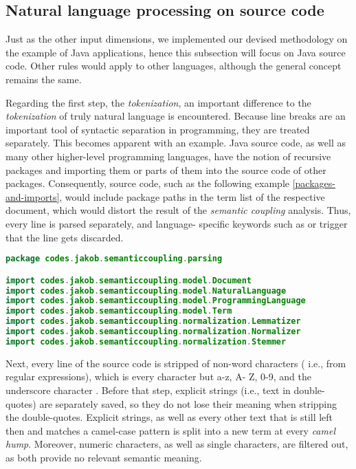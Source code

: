 \documentclass[12pt,a4paper]{report}
\begin{document}
\subsection{Natural language processing on source code}

Just as the other input dimensions, we implemented our devised methodology on
the example of Java applications, hence this subsection will focus on Java
source code. Other rules would apply to other languages, although the general
concept remains the same.

Regarding the first step, the \textit{tokenization}, an important difference to
the \textit{tokenization} of truly natural language is encountered. Because
line breaks are an important tool of syntactic separation in programming, they
are treated separately. This becomes apparent with an example. Java source
code, as well as many other higher-level programming languages, have the notion
of recursive packages and importing them or parts of them into the source code
of other packages. Consequently, source code, such as the following example
\ref{packages-and-imports}, would include package paths in the term list of the
respective document, which would distort the result of the \textit{semantic
coupling} analysis. Thus, every line is parsed separately, and language-
specific keywords such as  or  trigger that the line
gets discarded.

\begin{lstlisting}[caption=Packages and imports in Java, label=packages-and-imports, language=Java, breaklines=true]
package codes.jakob.semanticcoupling.parsing

import codes.jakob.semanticcoupling.model.Document
import codes.jakob.semanticcoupling.model.NaturalLanguage
import codes.jakob.semanticcoupling.model.ProgrammingLanguage
import codes.jakob.semanticcoupling.model.Term
import codes.jakob.semanticcoupling.normalization.Lemmatizer
import codes.jakob.semanticcoupling.normalization.Normalizer
import codes.jakob.semanticcoupling.normalization.Stemmer
\end{lstlisting}

Next, every line of the source code is stripped of non\hyp word characters (
i.e.,  from regular expressions), which is every character but a-z, A-
Z, 0-9, and the underscore character \cite{ieee1992posix}. Before that step,
explicit strings (i.e., text in double-quotes) are separately saved, so they do
not lose their meaning when stripping the double-quotes.
Explicit strings, as well as every other text that is still left then and
matches a camel-case pattern is split into a new term at every \textit{camel
hump}. Moreover, numeric characters, as well as single characters, are filtered
out, as both provide no relevant semantic meaning.
\end{document}
